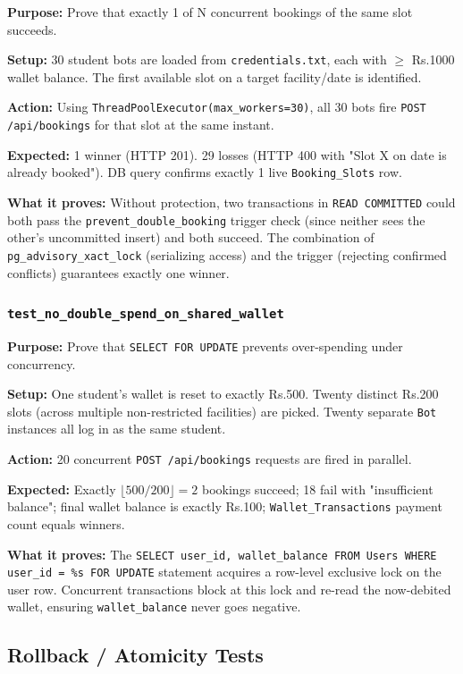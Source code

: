 \documentclass[11pt,a4paper]{article}
\begin{document}
\textbf{Purpose:} Prove that exactly 1 of N concurrent bookings of the same slot succeeds.

\textbf{Setup:} 30 student bots are loaded from \texttt{credentials.txt}, each with $\geq$ Rs.1000 wallet balance. The first available slot on a target facility/date is identified.

\textbf{Action:} Using \texttt{ThreadPoolExecutor(max\_workers=30)}, all 30 bots fire \texttt{POST /api/bookings} for that slot at the same instant.

\textbf{Expected:} 1 winner (HTTP 201). 29 losses (HTTP 400 with "Slot X on date is already booked"). DB query confirms exactly 1 live \texttt{Booking\_Slots} row.

\textbf{What it proves:} Without protection, two transactions in \texttt{READ COMMITTED} could both pass the \texttt{prevent\_double\_booking} trigger check (since neither sees the other's uncommitted insert) and both succeed. The combination of \texttt{pg\_advisory\_xact\_lock} (serializing access) and the trigger (rejecting confirmed conflicts) guarantees exactly one winner.

\subsubsection{\texttt{test\_no\_double\_spend\_on\_shared\_wallet}}

\textbf{Purpose:} Prove that \texttt{SELECT FOR UPDATE} prevents over-spending under concurrency.

\textbf{Setup:} One student's wallet is reset to exactly Rs.500. Twenty distinct Rs.200 slots (across multiple non-restricted facilities) are picked. Twenty separate \texttt{Bot} instances all log in as the same student.

\textbf{Action:} 20 concurrent \texttt{POST /api/bookings} requests are fired in parallel.

\textbf{Expected:} Exactly $\lfloor 500/200 \rfloor = 2$ bookings succeed; 18 fail with "insufficient balance"; final wallet balance is exactly Rs.100; \texttt{Wallet\_Transactions} payment count equals winners.

\textbf{What it proves:} The \texttt{SELECT user\_id, wallet\_balance FROM Users WHERE user\_id = \%s FOR UPDATE} statement acquires a row-level exclusive lock on the user row. Concurrent transactions block at this lock and re-read the now-debited wallet, ensuring \texttt{wallet\_balance} never goes negative.

\subsection{Rollback / Atomicity Tests}
\end{document}

